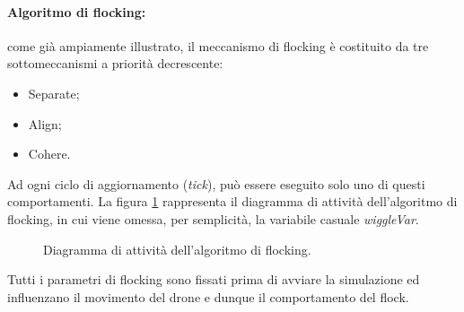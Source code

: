 \paragraph{Algoritmo di flocking:} come già ampiamente illustrato, il meccanismo di flocking è costituito da tre sottomeccanismi a priorità decrescente:
\begin{itemize}
    \item Separate;
    \item Align;
    \item Cohere.
\end{itemize}

Ad ogni ciclo di aggiornamento (\textit{tick}), può essere eseguito solo uno di questi comportamenti.
La figura \ref{activity_flocking} rappresenta il diagramma di attività dell'algoritmo di flocking, in cui viene omessa, per semplicità, la variabile casuale \textit{wiggleVar}.

\begin{figure}[H] 
    \captionsetup{justification=centering, margin=2cm, font=footnotesize}
    \begin{center}
    \end{center}
    \caption{Diagramma di attività dell'algoritmo di flocking.}
    \label{activity_flocking}
\end{figure}

Tutti i parametri di flocking sono fissati prima di avviare la simulazione ed influenzano il movimento del drone e dunque il comportamento del flock.

